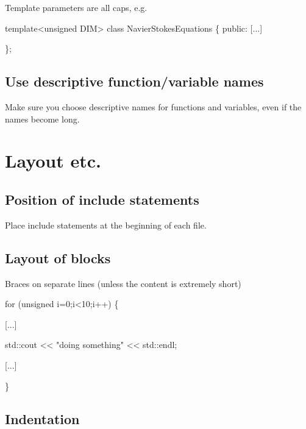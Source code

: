 \begin{DoxyItemize}
\item Template parameters are all caps, e.\-g. 
\begin{DoxyCode}
\textcolor{keyword}{template}<\textcolor{keywordtype}{unsigned} DIM>
\textcolor{keyword}{class }NavierStokesEquations
\{
  \textcolor{keyword}{public}:
  [...]

\};
\end{DoxyCode}

\end{DoxyItemize}\hypertarget{index_verbose}{}\subsection{Use descriptive function/variable names}\label{index_verbose}

\begin{DoxyItemize}
\item Make sure you choose descriptive names for functions and variables, even if the names become long.
\end{DoxyItemize}



 

\hypertarget{index_layout}{}\section{Layout etc.}\label{index_layout}
\hypertarget{index_include_files}{}\subsection{Position of include statements}\label{index_include_files}

\begin{DoxyItemize}
\item Place include statements at the beginning of each file.
\end{DoxyItemize}\hypertarget{index_layout_blocks}{}\subsection{Layout of blocks}\label{index_layout_blocks}

\begin{DoxyItemize}
\item Braces on separate lines (unless the content is extremely short) 
\begin{DoxyCode}
\textcolor{keywordflow}{for} (\textcolor{keywordtype}{unsigned} i=0;i<10;i++)
  \{

   [...]

   std::cout << \textcolor{stringliteral}{"doing something"} << std::endl;

   [...]

  \}
\end{DoxyCode}

\end{DoxyItemize}\hypertarget{index_indentation}{}\subsection{Indentation}\label{index_indentation}

